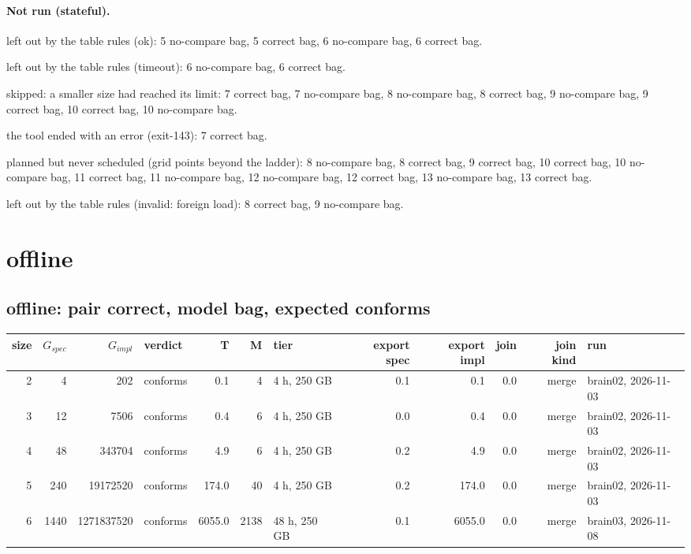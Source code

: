 \documentclass[10pt]{article}
\begin{document}
\paragraph{Not run (stateful).}
left out by the table rules (ok): 5 no-compare bag, 5 correct bag, 6 no-compare bag, 6 correct bag.\par
left out by the table rules (timeout): 6 no-compare bag, 6 correct bag.\par
skipped: a smaller size had reached its limit: 7 correct bag, 7 no-compare bag, 8 no-compare bag, 8 correct bag, 9 no-compare bag, 9 correct bag, 10 correct bag, 10 no-compare bag.\par
the tool ended with an error (exit-143): 7 correct bag.\par
planned but never scheduled (grid points beyond the ladder): 8 no-compare bag, 8 correct bag, 9 correct bag, 10 correct bag, 10 no-compare bag, 11 correct bag, 11 no-compare bag, 12 no-compare bag, 12 correct bag, 13 no-compare bag, 13 correct bag.\par
left out by the table rules (invalid: foreign load): 8 correct bag, 9 no-compare bag.\par
\section*{offline}
\subsection*{offline: pair \textsf{correct}, model bag, expected conforms}
\begin{longtable}{@{}rrrlrrlrrrrl@{}}
\toprule
size & $G_{\mathit{spec}}$ & $G_{\mathit{impl}}$ & verdict & T & M & tier & export spec & export impl & join & join kind & run \\
\midrule
\endhead
\color{blue} 2 & 4 & 202 & conforms & 0.1 & 4 & 4 h, 250 GB & 0.1 & 0.1 & 0.0 & merge & brain02, 2026-11-03 \\
\color{blue} 3 & 12 & 7506 & conforms & 0.4 & 6 & 4 h, 250 GB & 0.0 & 0.4 & 0.0 & merge & brain02, 2026-11-03 \\
\color{blue} 4 & 48 & 343704 & conforms & 4.9 & 6 & 4 h, 250 GB & 0.2 & 4.9 & 0.0 & merge & brain02, 2026-11-03 \\
\color{blue} 5 & 240 & 19172520 & conforms & 174.0 & 40 & 4 h, 250 GB & 0.2 & 174.0 & 0.0 & merge & brain02, 2026-11-03 \\
\color{blue} 6 & 1440 & 1271837520 & conforms & 6055.0 & 2138 & 48 h, 250 GB & 0.1 & 6055.0 & 0.0 & merge & brain03, 2026-11-08 \\
\bottomrule
\end{longtable}
\end{document}
